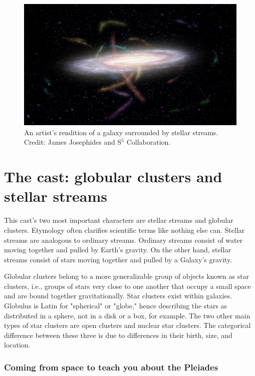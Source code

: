 \begin{figure}
    \centering
    \includegraphics[width=\linewidth]{images/S5MilkywayStreams.jpg}
    \caption{An artist's rendition of a galaxy surrounded by stellar streams. Credit: James Josephides and S$^5$ Collaboration.}
    \label{fig:images/Hubble_Tuning_Fork_diagram}
\end{figure}


\section{The cast: globular clusters and stellar streams}

This cast's two most important characters are stellar streams and globular clusters. Etymology often clarifies scientific terms like nothing else can. Stellar streams are analogous to ordinary streams. Ordinary streams consist of water moving together and pulled by Earth's gravity. On the other hand, stellar streams consist of stars moving together and pulled by a Galaxy's gravity.

Globular clusters belong to a more generalizable group of objects known as star clusters, i.e., groups of stars very close to one another that occupy a small space and are bound together gravitationally. Star clusters exist within galaxies. Globulus is Latin for "spherical" or "globe," hence describing the stars as distributed in a sphere, not in a disk or a box, for example. The two other main types of star clusters are open clusters and nuclear star clusters. The categorical difference between these three is due to differences in their birth, size, and 
location. 

\subsubsection*{Coming from space to teach you about the Pleiades }

